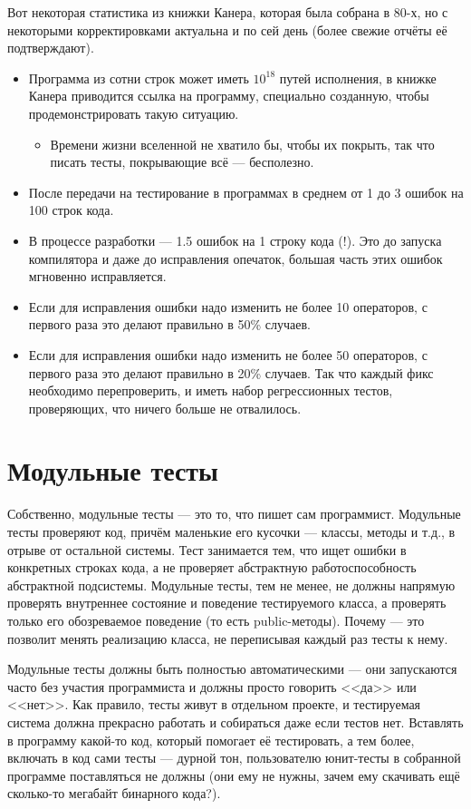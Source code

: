 \documentclass[a5paper]{article}
\begin{document}
Вот некоторая статистика из книжки Канера, которая была собрана в 80-х, но с некоторыми корректировками актуальна и по сей день (более свежие отчёты её подтверждают).

\begin{itemize}
    \item Программа из сотни строк может иметь $10^{18}$ путей исполнения, в книжке Канера приводится ссылка на программу, специально созданную, чтобы продемонстрировать такую ситуацию.
    \begin{itemize}
        \item Времени жизни вселенной не хватило бы, чтобы их покрыть, так что писать тесты, покрывающие всё --- бесполезно.
    \end{itemize}
    \item После передачи на тестирование в программах в среднем от 1 до 3 ошибок на 100 строк кода.
    \item В процессе разработки --- 1.5 ошибок на 1 строку кода (!). Это до запуска компилятора и даже до исправления опечаток, большая часть этих ошибок мгновенно исправляется.
    \item Если для исправления ошибки надо изменить не более 10 операторов, с первого раза это делают правильно в 50\% случаев.
    \item Если для исправления ошибки надо изменить не более 50 операторов, с первого раза это делают правильно в 20\% случаев. Так что каждый фикс необходимо перепроверить, и иметь набор регрессионных тестов, проверяющих, что ничего больше не отвалилось.
\end{itemize}

\section{Модульные тесты}

Собственно, модульные тесты --- это то, что пишет сам программист. Модульные тесты проверяют код, причём маленькие его кусочки --- классы, методы и т.д., в отрыве от остальной системы. Тест занимается тем, что ищет ошибки в конкретных строках кода, а не проверяет абстрактную работоспособность абстрактной подсистемы. Модульные тесты, тем не менее, не должны напрямую проверять внутреннее состояние и поведение тестируемого класса, а проверять только его обозреваемое поведение (то есть public-методы). Почему --- это позволит менять реализацию класса, не переписывая каждый раз тесты к нему.

Модульные тесты должны быть полностью автоматическими --- они запускаются часто без участия программиста и должны просто говорить <<да>> или <<нет>>. Как правило, тесты живут в отдельном проекте, и тестируемая система должна прекрасно работать и собираться даже если тестов нет. Вставлять в программу какой-то код, который помогает её тестировать, а тем более, включать в код сами тесты --- дурной тон, пользователю юнит-тесты в собранной программе поставляться не должны (они ему не нужны, зачем ему скачивать ещё сколько-то мегабайт бинарного кода?).
\end{document}
